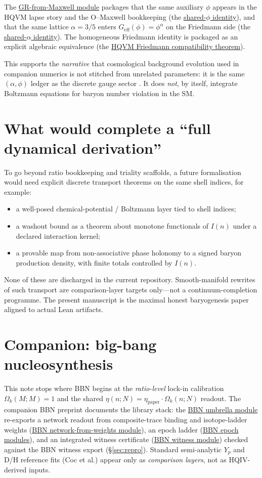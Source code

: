 \documentclass[11pt]{amsart}
\newcommand{\LeanEng}[2]{\hyperref[#1]{#2}}
\begin{document}
The \LeanEng{lean:gr-from-maxwell}{GR-from-Maxwell module} packages that
the same auxiliary $\phi$ appears in the HQVM lapse story and the
O--Maxwell bookkeeping (the \LeanEng{lean:same-phi}{shared-$\phi$
identity}), and that the same lattice $\alpha=3/5$ enters
$G_{\mathrm{eff}}(\phi)=\phi^{\alpha}$ on the Friedmann side (the
\LeanEng{lean:same-alpha}{shared-$\alpha$ identity}). The homogeneous
Friedmann identity is packaged as an explicit algebraic equivalence (the
\LeanEng{lean:friedmann-compat}{HQVM Friedmann compatibility theorem}).

This supports the \emph{narrative} that cosmological background evolution used in companion numerics is not stitched from unrelated parameters: it is the same \((\alpha,\phi)\) ledger as the discrete gauge sector \cite{hqiv-oct-action-paper}.
It does \emph{not}, by itself, integrate Boltzmann equations for baryon number violation in the SM.

\section{What would complete a ``full dynamical derivation''}

To go beyond ratio bookkeeping and triality scaffolds, a future formalisation
would need explicit discrete transport theorems on the same shell indices,
for example:
\begin{itemize}[leftmargin=2em]
\item a well-posed chemical-potential / Boltzmann layer tied to shell indices;
\item a washout bound as a theorem about monotone functionals of $I(n)$ under
  a declared interaction kernel;
\item a provable map from non-associative phase holonomy to a signed baryon
  production density, with finite totals controlled by $I(n)$.
\end{itemize}
None of these are discharged in the current repository. Smooth-manifold
rewrites of such transport are comparison-layer targets only---not a
continuum-completion programme. The present manuscript is the maximal
honest baryogenesis paper aligned to actual Lean artifacts.

\section*{Companion: big-bang nucleosynthesis \cite{hqiv-bbn-paper}}

This note stops where BBN begins at the \emph{ratio-level} lock-in
calibration $\Omega_k(M;M)=1$ and the shared
$\eta(n;N)=\eta_{\mathrm{paper}}\cdot\Omega_k(n;N)$ readout. The
companion BBN preprint documents the library stack: the
\LeanEng{lean:bbn-umbrella}{BBN umbrella module} re-exports a
network readout from composite-trace binding and isotope-ladder weights
(\LeanEng{lean:bbn-network}{BBN network-from-weights module}), an epoch
ladder (\LeanEng{lean:bbn-epoch}{BBN epoch modules}), and an integrated
witness certificate (\LeanEng{lean:bbn-witness}{BBN witness module})
checked against the BBN witness export (\S\ref{sec:repro}). Standard
semi-analytic $Y_p$ and D/H reference fits (Coc et al.) appear only as
\emph{comparison layers}, not as HQIV-derived inputs.
\end{document}
